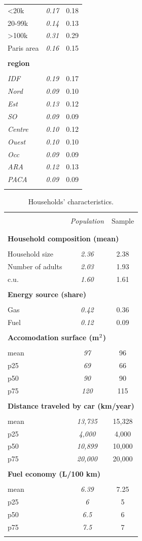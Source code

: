 \documentclass[english,5p,authoryear]{elsarticle}
\begin{document}
\begin{appendices}
\begin{table}[!htbp]
\begin{tabular}{lcc}
<20k & \emph{0.17} & 0.18\tabularnewline
20-99k & \emph{0.14} & 0.13\tabularnewline
>100k & \emph{0.31} & 0.29\tabularnewline
Paris area & \emph{0.16} & 0.15\tabularnewline
\hline  \\[-1.8ex]
\textbf{region} &  & \tabularnewline  \\[-1.8ex]
\emph{IDF} & \emph{0.19} & 0.17\tabularnewline
 \emph{Nord} & \emph{0.09} & 0.10\tabularnewline
 \emph{Est} & \emph{0.13} & 0.12\tabularnewline
\emph{SO} & \emph{0.09} & 0.09\tabularnewline
\emph{Centre} & \emph{0.10} & 0.12\tabularnewline
 \emph{Ouest} & \emph{0.10} & 0.10\tabularnewline
 \emph{Occ} & \emph{0.09} & 0.09\tabularnewline
\emph{ARA} & \emph{0.12} & 0.13\tabularnewline
\emph{PACA} & \emph{0.09} & 0.09\tabularnewline  \\[-1.8ex]
\hline \hline 
\end{tabular}\bigskip{}
\end{table}


\begin{table}[!htbp]
    \caption{Households' characteristics.\label{tab:app-energetic-characs}}
\centering
\begin{tabular}{lcc}
\hline \hline  \\[-1.8ex]
 & \emph{Population} & Sample  \tabularnewline \\[-1.8ex]
\hline  \\[-1.8ex]
\multicolumn{3}{l}{\textbf{Household composition (mean)}} \tabularnewline  \\[-1.8ex]
Household size & \emph{2.36} & 2.38\tabularnewline
Number of adults & \emph{2.03} & 1.93\tabularnewline
c.u. & \emph{1.60} & 1.61\tabularnewline
\hline   \\[-1.8ex]
\multicolumn{3}{l}{\textbf{Energy source (share)}} \tabularnewline  \\[-1.8ex]
Gas & \emph{0.42} & 0.36\tabularnewline
Fuel & \emph{0.12} & 0.09\tabularnewline
\hline   \\[-1.8ex]
\multicolumn{3}{l}{\textbf{Accomodation surface (m$^\textnormal{2}$)}} \tabularnewline  \\[-1.8ex]
mean & \emph{97} & 96\tabularnewline
p25 & \emph{69} & 66\tabularnewline
p50 & \emph{90} & 90\tabularnewline
p75 & \emph{120} & 115\tabularnewline
\hline   \\[-1.8ex]
\multicolumn{3}{l}{\textbf{Distance traveled by car (km/year)}} \tabularnewline  \\[-1.8ex]
mean & \emph{13,735} & 15,328\tabularnewline
p25 & \emph{4,000} & 4,000\tabularnewline
p50 & \emph{10,899} & 10,000 \tabularnewline
p75 & \emph{20,000 } & 20,000 \tabularnewline
\hline   \\[-1.8ex]
\multicolumn{3}{l}{\textbf{Fuel economy (L/100 km)}} \tabularnewline  \\[-1.8ex]
mean & \emph{6.39} & 7.25\tabularnewline
p25 & \emph{6} & 5\tabularnewline
p50 & \emph{6.5} & 6\tabularnewline
p75 & \emph{7.5} & 7\tabularnewline  \\[-1.8ex]
\hline \hline 
\end{tabular}\bigskip{}


\end{table}
\end{appendices}
\end{document}
